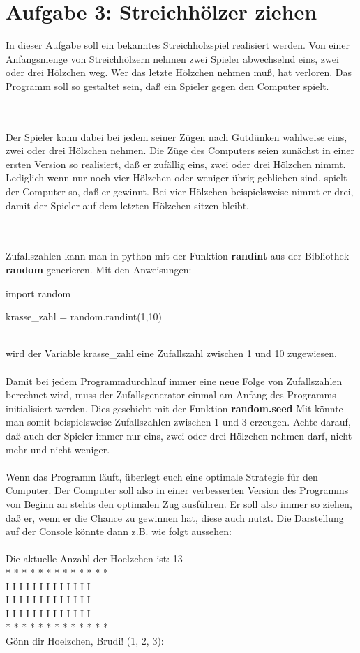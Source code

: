 
\section{Aufgabe 3: Streichhölzer ziehen}

In dieser Aufgabe soll ein bekanntes Streichholzspiel realisiert werden. Von einer Anfangsmenge von Streichhölzern nehmen zwei Spieler abwechselnd eins, zwei oder drei Hölzchen weg. Wer das
letzte Hölzchen nehmen muß, hat verloren. Das Programm soll so gestaltet sein, daß ein Spieler gegen den Computer spielt.

\ \\ \\Der Spieler kann dabei bei jedem seiner Zügen nach Gutdünken wahlweise eins, zwei oder drei Hölzchen nehmen. Die Züge des Computers seien zunächst in einer ersten Version so realisiert, daß er zufällig eins, zwei oder drei Hölzchen nimmt.
Lediglich wenn nur noch vier Hölzchen oder weniger übrig geblieben sind, spielt der Computer so, daß er gewinnt.
Bei vier Hölzchen beispielsweise nimmt er drei, damit der Spieler auf dem letzten Hölzchen sitzen bleibt. 

\ \\ \\Zufallszahlen kann man in python mit der Funktion \textbf{randint} aus der Bibliothek \textbf{random} generieren. Mit den Anweisungen:
\begin{python}
import random

krasse_zahl = random.randint(1,10)
\end{python}
\ \\wird der Variable krasse\_zahl eine Zufallszahl zwischen 1 und 10 zugewiesen. \ \\\\Damit bei jedem Programmdurchlauf immer eine neue Folge von Zufallszahlen berechnet wird, muss der Zufallsgenerator einmal am Anfang des Programms initialisiert werden. Dies geschieht mit der Funktion \textbf{random.seed} 
Mit könnte man somit beispielsweise Zufallszahlen zwischen 1 und 3 erzeugen. Achte darauf, daß
auch der Spieler immer nur eins, zwei oder drei Hölzchen nehmen darf, nicht mehr und nicht weniger. 
\ \\\\
Wenn das Programm läuft, überlegt euch eine optimale Strategie für den Computer. Der Computer soll also in einer verbesserten Version des Programms von
Beginn an stehts den optimalen Zug ausführen. Er soll also immer so ziehen, daß er, wenn er die
Chance zu gewinnen hat, diese auch nutzt.
Die Darstellung auf der Console könnte dann z.B. wie folgt aussehen:
\ \\\\
Die aktuelle Anzahl der Hoelzchen ist: 13
\ \\* * * * * * * * * * * * *
\ \\I I I I I I I I I I I I I
\ \\I I I I I I I I I I I I I
\ \\I I I I I I I I I I I I I
\ \\* * * * * * * * * * * * *
\ \\Gönn dir Hoelzchen, Brudi! (1, 2, 3):
